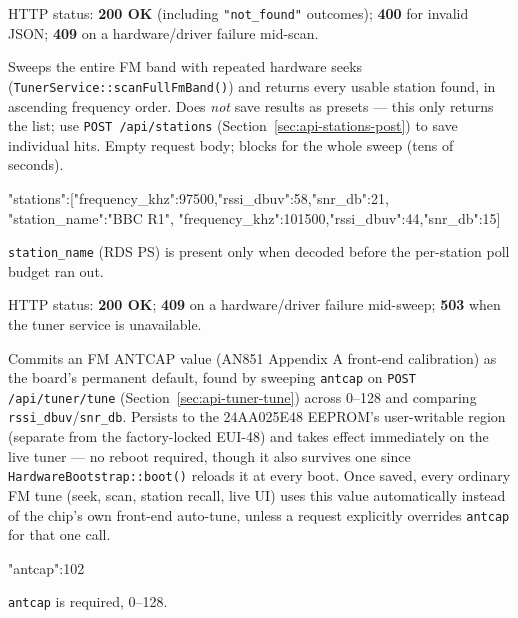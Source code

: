 HTTP status: \textbf{200 OK} (including \texttt{"not\_found"} outcomes);
\textbf{400} for invalid JSON; \textbf{409} on a hardware/driver failure
mid-scan.

\label{sec:api-tuner-scan-full}

Sweeps the entire FM band with repeated hardware seeks
(\texttt{TunerService::scanFullFmBand()}) and returns every usable station
found, in ascending frequency order. Does \emph{not} save results as
presets --- this only returns the list; use
\texttt{POST /api/stations} (Section~\ref{sec:api-stations-post}) to save
individual hits. Empty request body; blocks for the whole sweep (tens of
seconds).

\begin{drnote}
\begin{drcode}[JSON]
{"stations":[{"frequency_khz":97500,"rssi_dbuv":58,"snr_db":21,
              "station_name":"BBC R1"},
             {"frequency_khz":101500,"rssi_dbuv":44,"snr_db":15}]}
\end{drcode}
\texttt{station\_name} (RDS PS) is present only when decoded before the
per-station poll budget ran out.
\end{drnote}

HTTP status: \textbf{200 OK}; \textbf{409} on a hardware/driver failure
mid-sweep; \textbf{503} when the tuner service is unavailable.

\label{sec:api-tuner-calibrate-antenna}

Commits an FM ANTCAP value (AN851 Appendix A front-end calibration) as the
board's permanent default, found by sweeping \texttt{antcap} on
\texttt{POST /api/tuner/tune} (Section~\ref{sec:api-tuner-tune}) across
0--128 and comparing \texttt{rssi\_dbuv}/\texttt{snr\_db}. Persists to the
24AA025E48 EEPROM's user-writable region (separate from the factory-locked
EUI-48) and takes effect immediately on the live tuner --- no reboot
required, though it also survives one since \texttt{HardwareBootstrap::boot()}
reloads it at every boot. Once saved, every ordinary FM tune (seek, scan,
station recall, live UI) uses this value automatically instead of the
chip's own front-end auto-tune, unless a request explicitly overrides
\texttt{antcap} for that one call.

\begin{drnote}
\begin{drcode}[JSON]
{"antcap":102}
\end{drcode}
\texttt{antcap} is required, 0--128.
\end{drnote}

